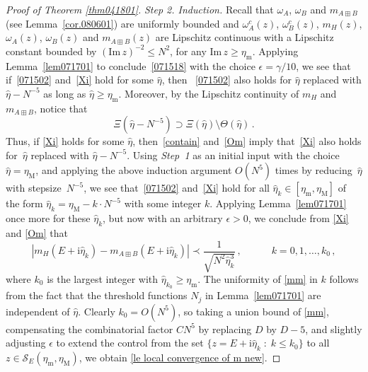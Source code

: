 \documentclass[10pt,reqno]{amsart}
\numberwithin{equation}{section}
\theoremstyle{plain}
\numberwithin{kevin}{section}
\theoremstyle{remark}
\newcommand{\im}{\mathrm{Im}\,}
\newcommand{\ii}{\mathrm{i}}
\newcommand{\wh}{\widehat}
\begin{document}
\begin{proof}[Proof of Theorem \ref{thm041801}]
 {\it Step 2. Induction.} Recall that $\omega_A$, $\omega_B$ and $m_{A\boxplus B}$ (see Lemma~\ref{cor.080601})
are uniformly bounded and $\omega_A^c(z)$, $\omega_B^c(z)$, $m_H(z)$, $\omega_A(z)$, $\omega_B(z)$ and $m_{A\boxplus B}(z)$
are Lipschitz continuous with a Lipschitz constant bounded by $(\im z)^{-2}\le N^2$, for any $\im z\ge \eta_{\mathrm{m}}$.
 Applying Lemma~\ref{lem071701}  to conclude~\eqref{071518} with  the choice $\epsilon=\gamma/10$, we see that if~\eqref{071502} and~\eqref{Xi} hold for some $\wh\eta$,
  then ~\eqref{071502}  also holds
   for $\wh\eta$ replaced with $\widehat{\eta}-N^{-5}$ as long as $\widehat{\eta}\geq \eta_\mathrm{m}$.
  Moreover, by the Lipschitz continuity of $m_H$ and $m_{A\boxplus B}$, notice that
 \begin{equation}\label{contain}
     \Xi(\wh\eta - N^{-5}) \supset \Xi(\wh\eta) \setminus\Theta(\wh\eta)\,.
 \end{equation}
Thus, if \eqref{Xi} holds for some $\wh\eta$, then~\eqref{contain} and~\eqref{Om} imply that~\eqref{Xi} also holds for~$\wh\eta$ replaced with $\widehat{\eta}-N^{-5}$. 
Using {\it Step~1} as an initial input with the choice~$\widehat{\eta} = \eta_{\mathrm{M}}$, 
and applying the above induction argument $O(N^5)$ times by reducing~$\widehat\eta$ with stepsize~$N^{-5}$,
we  see  that~\eqref{071502} and~\eqref{Xi}  hold for all $\wh\eta_k\in [\eta_\mathrm{m},\eta_{\mathrm{M}}]$
of the form $\wh\eta_k = \eta_{\mathrm{M}} - k\cdot N^{-5}$ with some integer $k$.
Applying Lemma~\ref{lem071701} once more
for these $\wh\eta_k$, but now with an arbitrary $\epsilon>0$, we conclude from \eqref{Xi} and  \eqref{Om} that
\begin{equation}\label{mm}
  |m_H(E+\ii \wh\eta_k)-m_{A\boxplus B}(E+\ii \wh\eta_k)|\prec\frac{1}{\sqrt{N^2\wh\eta_k^3}}\,, \qquad\quad k=0,1,\ldots, k_0\,,
\end{equation}
where $k_0$ is the largest integer with $\wh\eta_{k_0}\ge \eta_{\mathrm{m}}$.
The uniformity of \eqref{mm} in  $k$ follows from the fact that  the threshold functions $N_j$ in 
Lemma~\ref{lem071701} are independent of $\wh\eta$.
 Clearly $k_0=O(N^5)$, so taking a union bound of \eqref{mm}, compensating
the combinatorial  factor $CN^{5}$ by replacing $D$ by $D-5$, and slightly adjusting $\epsilon$ to
extend the control from the set $\{ z=E+\ii \wh\eta_k \; : \; k\le k_0\}$ to all $z\in\mathcal{S}_E( \eta_{\mathrm{m}},\eta_{\mathrm{M}})$,
we obtain \eqref{le local convergence of m new}.
\qedhere \end{proof}
\end{document}
